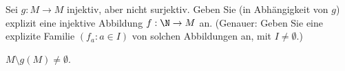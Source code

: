 
\begin{exercise}[270]

Sei $g: M \to M$ injektiv, aber nicht surjektiv. Geben Sie (in Abhängigkeit von $g$)
explizit eine injektive Abbildung $f: \N \to M$ an.
(Genauer: Geben Sie eine explizite Familie $(f_a: a \in I)$ von solchen Abbildungen
an, mit $I \neq \emptyset$.)

\end{exercise}


\begin{solution}

$M \setminus g(M) \neq \emptyset$.

\end{solution}
